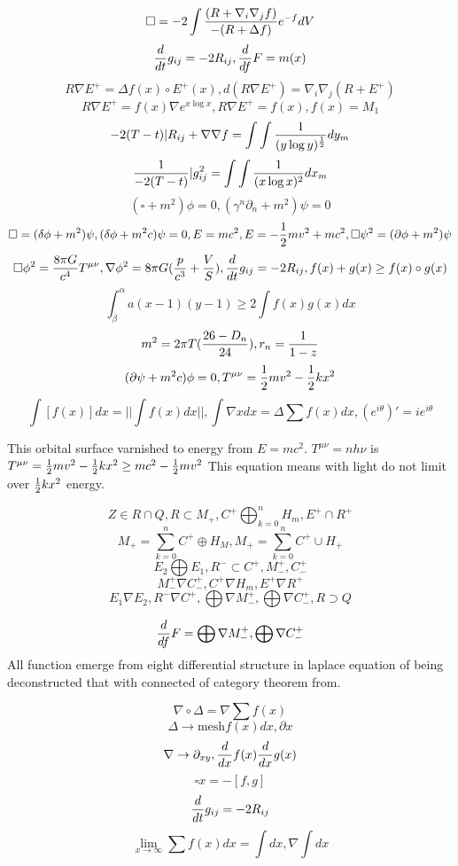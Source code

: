 \documentclass{jsarticle}
\begin{document}
$$ \square = - 2 \int {(R + \nabla_{i} \nabla_{j} f) \over - (R + \Delta f)}e^{-f}dV $$
$$ {d \over dt}g_{ij} = - 2R_{ij}, 
 {d \over df}F = m(x) $$
$$ R \nabla E^{+} = \Delta f(x) \circ E^{+}(x),
d(R \nabla E^{+}) = \nabla_{i} \nabla_{j} (R + E^{+}) $$
$$ R \nabla E^{+} = f(x) \nabla e^{x \log x}, 
R \nabla E^{+} = f(x), f(x) = M_1 $$
$$ -2 (T - t)|R_{ij} + \nabla \nabla f = \int \int {1 \over (y \log y)^{1 \over 2}}dy_m $$
$$ {1 \over - 2(T - t)}|g^2_{ij} = \int \int {1 \over (x \log x)^2}dx_m $$
$$ (\square + m^2)\phi = 0,
 (\gamma^n \partial_n + m^2)\psi = 0 $$
$$ \square = (\delta \phi + m^2)\psi, 
(\delta \phi + m^2 c)\psi = 0,  E = mc^2, E = - {1 \over 2}mv^2 + mc^2 , 
 \square \psi^2 = (\partial \phi + m^2)\psi $$
$$ \square \phi^2 = {8 \pi G \over c^4} T^{\mu\nu},
\nabla \phi^2 = 8 \pi G({p \over c^3} + {V \over S}), {d \over dt}g_{ij} = - 2 R_{ij},
f(x) + g(x) \ge f(x) \circ g(x) $$
$$ \int^{\alpha}_{\beta} a(x - 1)(y - 1) \ge 2 \int f(x)g(x)dx $$
 $$ m^2 = 2 \pi T ({26 - D_n \over 24}), r_n = {1 \over 1 - z} $$ 
$$ (\partial \psi + m^2 c)\phi = 0,
T^{\mu\nu} = {1 \over 2}mv^2 - {1 \over 2}kx^2 $$
$$ \int[f(x)] dx = ||\int f(x)dx||,
\int \nabla x dx = \Delta \sum f(x) dx , (e^{i \theta})' = i e^{i \theta} $$

This orbital surface varnished to energy from $ E = mc^2 $. $ T^{\mu\nu} = nh\nu $ 
is $ T^{\mu\nu} = {1 \over 2}mv^2 - {1 \over 2}kx^2 \ge mc^2 - {1 \over 2}mv^2 $
This equation means with light do not limit over $ {1 \over 2}kx^2 $ energy.

$$ Z \in R \cap Q, R \subset M_{+}, C^{+} \bigoplus^{n}_{k=0} H_{m}, E^{+} \cap R^{+}$$
$$ M_{+} = \sum^{n}_{k=0} C^{+} \oplus H_{M}, M_{+} = \sum^{n}_{k=0} C^{+} \cup H_{+} $$
$$ E_{2} \bigoplus E_{1}, R^{-} \subset C^{+}, M^{+}_{-}, C^{+}_{-} $$
$$ M^{+}_{-} \nabla C^{+}_{-} , C^{+}\nabla H_{m}, E^{+}\nabla R^{+} $$
$$ E_{1} \nabla E_{2}, R^{-} \nabla C^{+}, \bigoplus \nabla M^{+}_{-}, 
 \bigoplus \nabla C^{+}_{-}, R \supset Q $$

$$ {d \over df}{F} = \bigoplus \nabla M^{+}_{-}, \bigoplus \nabla C^{+}_{-} $$
 All function emerge from eight differential structure in laplace equation
of being deconstructed that with  connected of category theorem from.


$$ \nabla \circ \Delta = \nabla \sum f(x) $$
$$ \Delta \to \mathrm{mesh}f(x)dx,\partial x $$
$$ \nabla \to \partial_{xy}, {d \over dx}f(x){d \over dx}g(x) $$
$$ \square x = - [f, g] $$
$$ {d \over dt}g_{ij} = - 2 R_{ij} $$
$$ \lim_{x \to \infty} \sum f(x) dx = \int dx, \nabla \int dx $$
\end{document}
